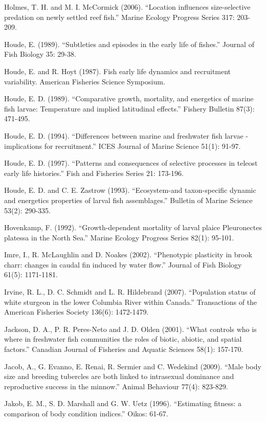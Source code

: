 \documentclass[]{book}
\begin{document}
Holmes, T. H. and M. I. McCormick (2006). ``Location influences
size-selective predation on newly settled reef fish.'' Marine Ecology
Progress Series 317: 203-209.

Houde, E. (1989). ``Subtleties and episodes in the early life of
fishes.'' Journal of Fish Biology 35: 29-38.

Houde, E. and R. Hoyt (1987). Fish early life dynamics and recruitment
variability. American Fisheries Science Symposium.

Houde, E. D. (1989). ``Comparative growth, mortality, and energetics of
marine fish larvae: Temperature and implied latitudinal effects.''
Fishery Bulletin 87(3): 471-495.

Houde, E. D. (1994). ``Differences between marine and freshwater fish
larvae - implications for recruitment.'' ICES Journal of Marine Science
51(1): 91-97.

Houde, E. D. (1997). ``Patterns and consequences of selective processes
in teleost early life histories.'' Fish and Fisheries Series 21:
173-196.

Houde, E. D. and C. E. Zastrow (1993). ``Ecosystem-and taxon-specific
dynamic and energetics properties of larval fish assemblages.'' Bulletin
of Marine Science 53(2): 290-335.

Hovenkamp, F. (1992). ``Growth-dependent mortality of larval plaice
Pleuronectes platessa in the North Sea.'' Marine Ecology Progress Series
82(1): 95-101.

Imre, I., R. McLaughlin and D. Noakes (2002). ``Phenotypic plasticity in
brook charr: changes in caudal fin induced by water flow.'' Journal of
Fish Biology 61(5): 1171-1181.

Irvine, R. L., D. C. Schmidt and L. R. Hildebrand (2007). ``Population
status of white sturgeon in the lower Columbia River within Canada.''
Transactions of the American Fisheries Society 136(6): 1472-1479.

Jackson, D. A., P. R. Peres-Neto and J. D. Olden (2001). ``What controls
who is where in freshwater fish communities the roles of biotic,
abiotic, and spatial factors.'' Canadian Journal of Fisheries and
Aquatic Sciences 58(1): 157-170.

Jacob, A., G. Evanno, E. Renai, R. Sermier and C. Wedekind (2009).
``Male body size and breeding tubercles are both linked to intrasexual
dominance and reproductive success in the minnow.'' Animal Behaviour
77(4): 823-829.

Jakob, E. M., S. D. Marshall and G. W. Uetz (1996). ``Estimating
fitness: a comparison of body condition indices.'' Oikos: 61-67.
\end{document}
